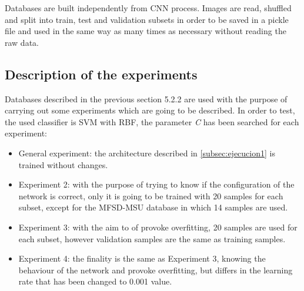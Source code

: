 Databases are built independently from CNN process. Images are read, shuffled and split into train, test and validation subsets in order to be saved in a pickle file and used in the same way as many times as necessary without reading the raw data.

\subsection{Description of the experiments} \label{sec:experiments_ejec1}
Databases described in the previous section 5.2.2 are used with the purpose of carrying out some experiments which are going to be described. In order to test, the used classifier is SVM with RBF, the parameter \textit{C} has been searched for each experiment:
\begin{itemize}
\item General experiment: the architecture described in \ref{subsec:ejecucion1} is trained without changes.
\item Experiment 2: with the purpose of trying to know if the configuration of the network is correct, only it is going to be trained with 20 samples for each subset, except for the MFSD-MSU database in which 14 samples are used.
\item Experiment 3: with the aim to of provoke overfitting, 20 samples are used for each subset, however validation samples are the same as training samples.
\item Experiment 4: the finality is the same as Experiment 3, knowing the behaviour of the network and provoke overfitting, but differs in the learning rate that has been changed to 0.001 value.
\end{itemize}

